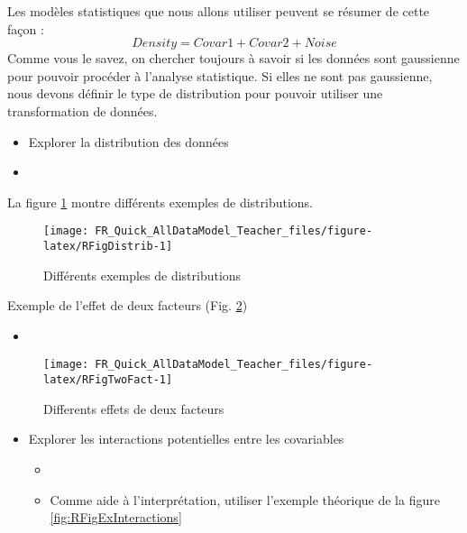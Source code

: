 \documentclass[french,a4paper]{article}
\providecommand{\tightlist}{%
  \setlength{\itemsep}{0pt}\setlength{\parskip}{0pt}}
\begin{document}
Les modèles statistiques que nous allons utiliser peuvent se résumer de
cette façon : \[Density = Covar1 + Covar2 + Noise\] Comme vous le savez,
on chercher toujours à savoir si les données sont gaussienne pour
pouvoir procéder à l'analyse statistique. Si elles ne sont pas
gaussienne, nous devons définir le type de distribution pour pouvoir
utiliser une transformation de données.

\begin{itemize}
\tightlist
\item
  Explorer la distribution des données
\item
\end{itemize}

La figure \ref{fig:RFigDistrib} montre différents exemples de
distributions.



\begin{figure}[!h]

{\centering \texttt{[image: FR\_Quick\_AllDataModel\_Teacher\_files/figure-latex/RFigDistrib-1]} 

}

\caption{Différents exemples de distributions\\}\label{fig:RFigDistrib}
\end{figure}

Exemple de l'effet de deux facteurs (Fig. \ref{fig:RFigTwoFact})



\begin{itemize}
\tightlist
\item
\end{itemize}

\begin{figure}[!h]

{\centering \texttt{[image: FR\_Quick\_AllDataModel\_Teacher\_files/figure-latex/RFigTwoFact-1]} 

}

\caption{Differents effets de deux facteurs}\label{fig:RFigTwoFact}
\end{figure}

\begin{itemize}
\tightlist
\item
  Explorer les interactions potentielles entre les covariables

  \begin{itemize}
  \item
  \item
    Comme aide à l'interprétation, utiliser l'exemple théorique de la
    figure \ref{fig:RFigExInteractions}
  \end{itemize}
\end{itemize}
\end{document}
